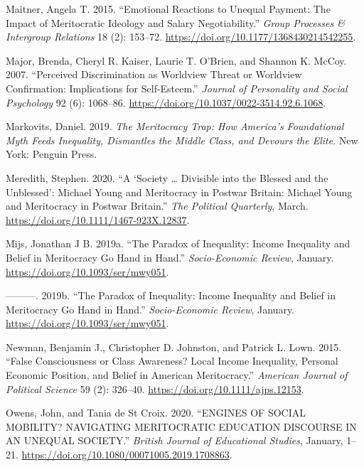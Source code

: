 \documentclass[
]{article}
\begin{document}
\leavevmode\hypertarget{ref-MaitnerEmotionalreactionsunequal2015}{}%
Maitner, Angela T. 2015. ``Emotional Reactions to Unequal Payment: The
Impact of Meritocratic Ideology and Salary Negotiability.'' \emph{Group
Processes \& Intergroup Relations} 18 (2): 153--72.
\url{https://doi.org/10.1177/1368430214542255}.

\leavevmode\hypertarget{ref-MajorPerceiveddiscriminationworldview2007}{}%
Major, Brenda, Cheryl R. Kaiser, Laurie T. O'Brien, and Shannon K.
McCoy. 2007. ``Perceived Discrimination as Worldview Threat or Worldview
Confirmation: Implications for Self-Esteem.'' \emph{Journal of
Personality and Social Psychology} 92 (6): 1068--86.
\url{https://doi.org/10.1037/0022-3514.92.6.1068}.

\leavevmode\hypertarget{ref-markovits_Meritocracy_2019}{}%
Markovits, Daniel. 2019. \emph{The Meritocracy Trap: How America's
Foundational Myth Feeds Inequality, Dismantles the Middle Class, and
Devours the Elite}. New York: Penguin Press.

\leavevmode\hypertarget{ref-Meredithsocietydivisibleblessed2020}{}%
Meredith, Stephen. 2020. ``A `Society \ldots{} Divisible into the
Blessed and the Unblessed': Michael Young and Meritocracy in Postwar
Britain: Michael Young and Meritocracy in Postwar Britain.'' \emph{The
Political Quarterly}, March.
\url{https://doi.org/10.1111/1467-923X.12837}.

\leavevmode\hypertarget{ref-MijsParadoxInequalityIncome2019b}{}%
Mijs, Jonathan J B. 2019a. ``The Paradox of Inequality: Income
Inequality and Belief in Meritocracy Go Hand in Hand.''
\emph{Socio-Economic Review}, January.
\url{https://doi.org/10.1093/ser/mwy051}.

\leavevmode\hypertarget{ref-mijs_paradox_2019}{}%
---------. 2019b. ``The Paradox of Inequality: Income Inequality and
Belief in Meritocracy Go Hand in Hand.'' \emph{Socio-Economic Review},
January. \url{https://doi.org/10.1093/ser/mwy051}.

\leavevmode\hypertarget{ref-newman_false_2015}{}%
Newman, Benjamin J., Christopher D. Johnston, and Patrick L. Lown. 2015.
``False Consciousness or Class Awareness? Local Income Inequality,
Personal Economic Position, and Belief in American Meritocracy.''
\emph{American Journal of Political Science} 59 (2): 326--40.
\url{https://doi.org/10.1111/ajps.12153}.

\leavevmode\hypertarget{ref-OwensENGINESSOCIALMOBILITY2020}{}%
Owens, John, and Tania de St Croix. 2020. ``ENGINES OF SOCIAL MOBILITY?
NAVIGATING MERITOCRATIC EDUCATION DISCOURSE IN AN UNEQUAL SOCIETY.''
\emph{British Journal of Educational Studies}, January, 1--21.
\url{https://doi.org/10.1080/00071005.2019.1708863}.
\end{document}
